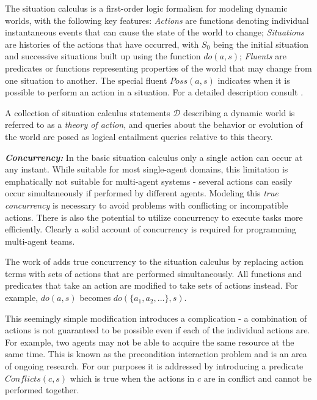 \documentclass[times, 10pt, twocolumn]{article}
\begin{document}


The situation calculus is a first-order logic formalism for modeling
dynamic worlds, with the following key features: \emph{Actions} are
functions denoting individual instantaneous events that can cause
the state of the world to change; \emph{Situations} are histories
of the actions that have occurred, with $S_{0}$ being the initial
situation and successive situations built up using the function $do(a,s)$;
\emph{Fluents} are predicates or functions representing properties
of the world that may change from one situation to another. The special
fluent $Poss(a,s)$ indicates when it is possible to perform an action
in a situation. For a detailed description consult \cite{pirri99contributions_sitcalc}.

A collection of situation calculus statements $\mathcal{D}$ describing
a dynamic world is referred to as a \emph{theory of action}, and queries
about the behavior or evolution of the world are posed as logical
entailment queries relative to this theory.

\textbf{\emph{Concurrency:}} In the basic situation calculus only
a single action can occur at any instant. While suitable for most
single-agent domains, this limitation is emphatically not suitable
for multi-agent systems - several actions can easily occur simultaneously
if performed by different agents. Modeling this \emph{true concurrency}
is necessary to avoid problems with conflicting or incompatible actions.
There is also the potential to utilize concurrency to execute tasks
more efficiently. Clearly a solid account of concurrency is required
for programming multi-agent teams.

The work of \cite{lin92sc_conc,reiter96sc_nat_conc} adds true concurrency
to the situation calculus by replacing action terms with sets of actions
that are performed simultaneously. All functions and predicates that
take an action are modified to take sets of actions instead. For example,
$do(a,s)$ becomes $do(\{ a_{1},a_{2},...\},s)$.

This seemingly simple modification introduces a complication - a combination
of actions is not guaranteed to be possible even if each of the individual
actions are. For example, two agents may not be able to acquire the
same resource at the same time. This is known as the precondition
interaction problem \cite{pinto94temporal} and is an area of ongoing
research. For our purposes it is addressed by introducing a predicate
$Conflicts(c,s)$ which is true when the actions in $c$ are in conflict
and cannot be performed together.
\end{document}
